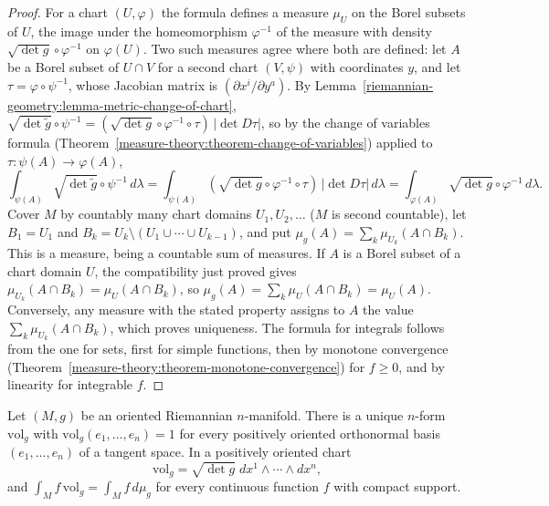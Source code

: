 \begin{proof}
For a chart $(U, \varphi)$ the formula defines a measure $\mu_U$ on the Borel subsets of $U$, the image under the homeomorphism $\varphi^{-1}$ of the measure with density
$\sqrt{\det g} \circ \varphi^{-1}$ on $\varphi(U)$. Two such measures agree where both are defined: let $A$ be a Borel subset of $U \cap V$ for a second chart
$(V, \psi)$ with coordinates $y$, and let $\tau = \varphi \circ \psi^{-1}$, whose Jacobian matrix is $(\partial x^i/\partial y^a)$. By
Lemma~\ref{riemannian-geometry:lemma-metric-change-of-chart}, $\sqrt{\det\tilde g} \circ \psi^{-1} = (\sqrt{\det g} \circ \varphi^{-1} \circ \tau)\,|\det D\tau|$, so by
the change of variables formula (Theorem~\ref{measure-theory:theorem-change-of-variables}) applied to $\tau \colon \psi(A) \to \varphi(A)$,
\[
\int_{\psi(A)}\sqrt{\det\tilde g} \circ \psi^{-1}\,d\lambda = \int_{\psi(A)}(\sqrt{\det g} \circ \varphi^{-1} \circ \tau)\,|\det D\tau|\,d\lambda
= \int_{\varphi(A)}\sqrt{\det g} \circ \varphi^{-1}\,d\lambda .
\]
Cover $M$ by countably many chart domains $U_1, U_2, \ldots$ ($M$ is second countable), let $B_1 = U_1$ and $B_k = U_k \setminus (U_1 \cup \cdots \cup U_{k-1})$, and put
$\mu_g(A) = \sum_k\mu_{U_k}(A \cap B_k)$. This is a measure, being a countable sum of measures. If $A$ is a Borel subset of a chart domain $U$, the
compatibility just proved gives $\mu_{U_k}(A \cap B_k) = \mu_U(A \cap B_k)$, so $\mu_g(A) = \sum_k\mu_U(A \cap B_k) = \mu_U(A)$. Conversely, any measure with the
stated property assigns to $A$ the value $\sum_k\mu_{U_k}(A \cap B_k)$, which proves uniqueness. The formula for integrals follows from the one for sets, first
for simple functions, then by monotone convergence (Theorem~\ref{measure-theory:theorem-monotone-convergence}) for $f \geq 0$, and by linearity for integrable $f$.
\end{proof}

\begin{proposition}\label{riemannian-geometry:proposition-volume-form}
Let $(M, g)$ be an oriented Riemannian $n$-manifold. There is a unique $n$-form $\mathrm{vol}_g$ with $\mathrm{vol}_g(e_1, \ldots, e_n) = 1$ for every positively
oriented orthonormal basis $(e_1, \ldots, e_n)$ of a tangent space. In a positively oriented chart
\[
\mathrm{vol}_g = \sqrt{\det g}\;dx^1 \wedge \cdots \wedge dx^n,
\]
and $\int_Mf\,\mathrm{vol}_g = \int_Mf\,d\mu_g$ for every continuous function $f$ with compact support.
\end{proposition}

